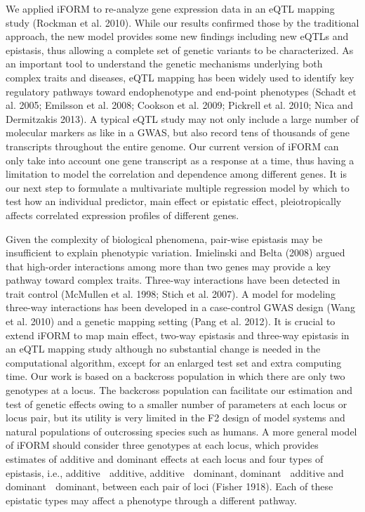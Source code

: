 \documentclass[]{book}
\theoremstyle{definition}
\theoremstyle{definition}
\theoremstyle{remark}
\begin{document}
We applied iFORM to re-analyze gene expression data in an eQTL mapping
study (Rockman et al. 2010). While our results confirmed those by the
traditional approach, the new model provides some new findings including
new eQTLs and epistasis, thus allowing a complete set of genetic
variants to be characterized. As an important tool to understand the
genetic mechanisms underlying both complex traits and diseases, eQTL
mapping has been widely used to identify key regulatory pathways toward
endophenotype and end-point phenotypes (Schadt et al. 2005; Emilsson et
al. 2008; Cookson et al. 2009; Pickrell et al. 2010; Nica and
Dermitzakis 2013). A typical eQTL study may not only include a large
number of molecular markers as like in a GWAS, but also record tens of
thousands of gene transcripts throughout the entire genome. Our current
version of iFORM can only take into account one gene transcript as a
response at a time, thus having a limitation to model the correlation
and dependence among different genes. It is our next step to formulate a
multivariate multiple regression model by which to test how an
individual predictor, main effect or epistatic effect, pleiotropically
affects correlated expression profiles of different genes.

Given the complexity of biological phenomena, pair-wise epistasis may be
insufficient to explain phenotypic variation. Imielinski and Belta
(2008) argued that high-order interactions among more than two genes may
provide a key pathway toward complex traits. Three-way interactions have
been detected in trait control (McMullen et al. 1998; Stich et al.
2007). A model for modeling three-way interactions has been developed in
a case-control GWAS design (Wang et al. 2010) and a genetic mapping
setting (Pang et al. 2012). It is crucial to extend iFORM to map main
effect, two-way epistasis and three-way epistasis in an eQTL mapping
study although no substantial change is needed in the computational
algorithm, except for an enlarged test set and extra computing time. Our
work is based on a backcross population in which there are only two
genotypes at a locus. The backcross population can facilitate our
estimation and test of genetic effects owing to a smaller number of
parameters at each locus or locus pair, but its utility is very limited
in the F2 design of model systems and natural populations of outcrossing
species such as humans. A more general model of iFORM should consider
three genotypes at each locus, which provides estimates of additive and
dominant effects at each locus and four types of epistasis, i.e.,
additive  additive, additive  dominant, dominant  additive and
dominant  dominant, between each pair of loci (Fisher 1918). Each of
these epistatic types may affect a phenotype through a different
pathway.
\end{document}

